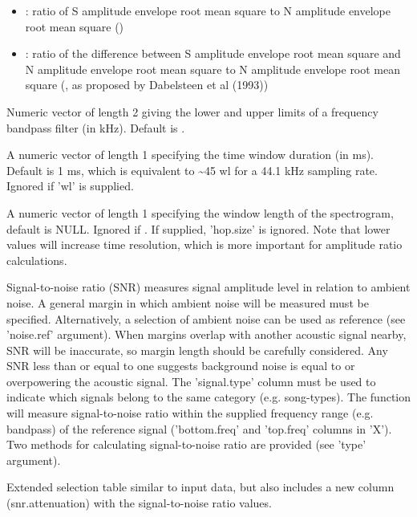 \documentclass[letterpaper]{book}
\begin{document}
\begin{Arguments}
\begin{ldescription}
\begin{itemize}
\item{} : ratio of S amplitude envelope root mean square to N amplitude envelope root mean square
()
\item{} : ratio of the difference between S amplitude envelope root mean square and N amplitude envelope root mean square to N amplitude envelope root mean square (, as proposed by Dabelsteen et al (1993))

\end{itemize}


\item[\code{bp}] Numeric vector of length 2 giving the lower and upper limits of a frequency bandpass filter (in kHz). Default is .

\item[\code{hop.size}] A numeric vector of length 1 specifying the time window duration (in ms). Default is 1 ms, which is equivalent to \textasciitilde{}45 wl for a 44.1 kHz sampling rate. Ignored if 'wl' is supplied.

\item[\code{wl}] A numeric vector of length 1 specifying the window length of the spectrogram, default 
is NULL. Ignored if . If supplied, 'hop.size' is ignored.
Note that lower values will increase time resolution, which is more important for amplitude ratio calculations.
\end{ldescription}
\end{Arguments}
%
\begin{Details}\relax
Signal-to-noise ratio (SNR) measures signal amplitude level in relation to ambient noise. A general margin in which ambient noise will be measured must be specified. Alternatively, a selection of ambient noise can be used as reference (see 'noise.ref' argument). When margins overlap with another acoustic signal nearby, SNR will be inaccurate, so margin length should be carefully considered. Any SNR less than or equal to one suggests background noise is equal to or overpowering the acoustic signal. The 'signal.type' column must be used to indicate which signals belong to the same category (e.g. song-types). The function will measure signal-to-noise ratio within the supplied frequency range (e.g. bandpass) of the reference signal ('bottom.freq' and 'top.freq' columns in 'X'). Two methods for calculating signal-to-noise ratio are provided (see 'type' argument).
\end{Details}
%
\begin{Value}
Extended selection table similar to input data, but also includes a new column (snr.attenuation)
with the signal-to-noise ratio values.
\end{Value}
\end{document}
